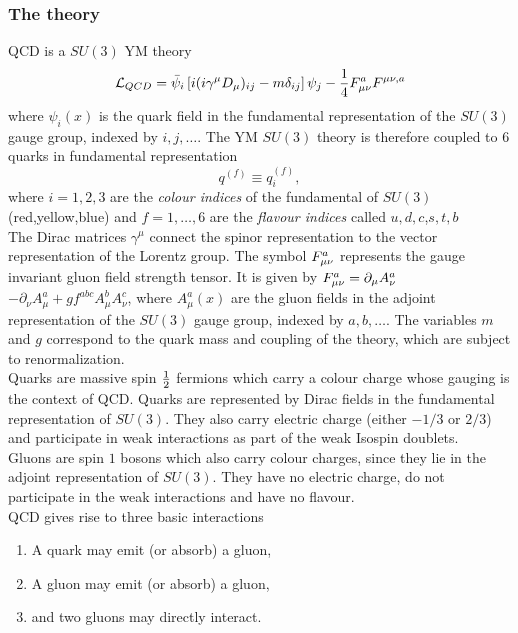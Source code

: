 \subsubsection{The theory}
QCD is a $SU(3)$ YM theory
\begin{equation}
	\label{eq:qcdlagrangian}
	\mathcal{L}_{QCD} = \bar{\psi}_i \left[i(i\gamma^\mu D_\mu)_{ij}-m \delta_{ij}\right]\psi_j - \frac{1}{4} F^a_{\mu \nu} F^{\mu \nu, a}
\end{equation}
where $\psi_i(x)$ is the quark field in the fundamental representation of the $SU(3)$ gauge group, indexed by $i,j,\dots$. The YM $SU(3)$ theory is therefore coupled to $6$ quarks in fundamental representation
\begin{equation}
q^{(f)} \equiv q^{(f)}_i,
\end{equation}
where $i=1,2,3$ are the \emph{colour indices} of the fundamental of $SU(3)$ (red,yellow,blue) and $f=1,\dots,6$ are the \emph{flavour indices} called $u,d,c$,$s,t,b$\\ The Dirac matrices $\gamma^\mu$ connect the spinor representation to the vector representation of the Lorentz group. The symbol $F^a\munu$ represents the gauge invariant gluon field strength tensor. It is given by $F^a\munu = \partial_\mu A^a_\nu$$ - \partial_\nu A^a_\mu +g f^{abc} A^b_\mu A^c_\nu$, where $A^a_\mu(x)$ are the gluon fields in the adjoint representation of the $SU(3)$ gauge group, indexed by $a,b,\dots$. The variables $m$ and $g$ correspond to the quark mass and coupling of the theory, which are subject to renormalization.\\
 Quarks are massive spin $\half$ fermions which carry a colour charge whose gauging is the context of QCD. Quarks are represented by Dirac fields in the fundamental representation of $SU(3)$. They also carry electric charge (either $-1/3$ or $2/3$) and participate in weak interactions as part of the weak Isospin doublets.\\
Gluons are spin $1$ bosons which also carry colour charges, since they lie in the adjoint representation of $SU(3)$. They have no electric charge, do not participate in the weak interactions and have no flavour.\\
QCD gives rise to three basic interactions
\begin{enumerate}
	\item A quark may emit (or absorb) a gluon,
	\item A gluon may emit (or absorb) a gluon,
	\item and two gluons may directly interact.
\end{enumerate}
$$
